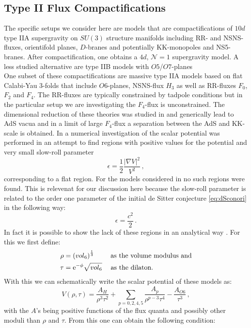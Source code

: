 \documentclass[a4paper,12pt,twoside,openright]{report}
\newcommand{\be}{\begin{equation}}
\newcommand{\ee}{\end{equation}}
\newcommand{\bea}{\begin{equation}\begin{aligned}}
\newcommand{\eea}{\end{aligned}\end{equation}}
\def\rme{{\rm e}}
\begin{document}
\subsection{Type II Flux Compactifications}
The specific setups we consider here are models that are compactifications of $10d$ type IIA supergravity on $SU(3)$ structure manifolds including RR- and NSNS-fluxes, orientifold planes, $D$-branes and potentially KK-monopoles and NS5-branes. After compactification, one obtains a $4d$, $\mathcal{N}=1$ supergravity model. A less studied alternative are type IIB models with $O5$/$O7$-planes \cite{Aharony:2010af,Lust:2009zb,Petrini:2013ika}\\
One subset of these compactifications are massive type IIA models based on flat Calabi-Yau 3-folds that include $O6$-planes, NSNS-flux $H_3$ as well as RR-fluxes $F_0$, $F_2$ and $F_4$. The RR-fluxes are typically constrained by tadpole conditions but in the particular setup we are investigating the $F_4$-flux is unconstrained. The dimensional reduction of these theories was studied in \cite{Grimm:2004ua} and generically lead to AdS vacua \cite{Villadoro:2005cu,DeWolfe:2005uu,Camara:2005dc,Ihl:2006pp} and in a limit of large $F_4$-flux a separation between the AdS and KK-scale is obtained. In \cite{Hertzberg:2007ke} a numerical investigation of the scalar potential was performed in an attempt to find regions with positive values for the potential and very small slow-roll parameter
\be 
\epsilon = \frac{1}{2} \frac{|\nabla V|^ 2}{V^ 2}\,,
\ee
corresponding to a flat region. For the models considered in \cite{Villadoro:2005cu,DeWolfe:2005uu,Ihl:2006pp} no such regions were found. This is relevenat for our discussion here because the slow-roll parameter is related to the order one parameter of the initial de Sitter conjecture \eqref{eq:dSconori} in the following way:
\be 
\epsilon = \frac{c^ 2}{2}\,.
\ee
In fact it is possible to show the lack of these regions in an analytical way \cite{Hertzberg:2007wc}. For this we first define:
\bea 
\rho &= \left(vol_6\right)^ {\frac{1}{3}} \;\qquad \text{as the volume modulus and}\\
\tau &= \rme^ {-\phi} \sqrt{vol_6} \;\quad \text{as the dilaton.}
\eea 
With this we can schematically write the scalar potential of these models as:
\be 
V(\rho,\tau) = \frac{A_H}{\rho^3 \tau^2} + \sum_{p=0,2,4,5} \frac{A_p}{\rho^ {p-3} \tau^4} - \frac{A_{O6}}{\tau^3}\,,
\ee
with the $A$'s being positive functions of the flux quanta and possibly other moduli than $\rho$ and $\tau$. From this one can obtain the following condition:
\end{document}
